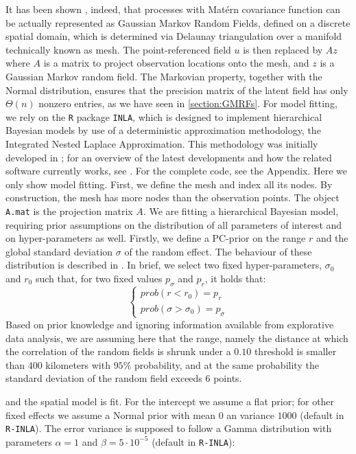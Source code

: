 \documentclass{book}
\begin{document}
It has been shown \cite{SPDE}, indeed, that processes with Matérn covariance function can be actually represented as Gaussian Markov Random Fields, defined on a discrete spatial domain, which is determined via Delaunay triangulation over a manifold technically known as mesh. The point-referenced field $u$ is then replaced by $A z$ where $A$ is a matrix to project observation locations onto the mesh, and $z$ is a Gaussian Markov random field. The Markovian property, together with the Normal distribution, ensures that the precision matrix of the latent field has only $\Theta (n) $ nonzero entries, as we have seen in \ref{section:GMRFs}. For model fitting, we rely on the \texttt{R} package \texttt{INLA}, which is designed to implement hierarchical Bayesian models by use of a deterministic approximation methodology, the Integrated Nested Laplace Approximation. This methodology was initially developed in \cite{INLA}; for an overview of the latest developments and how the related software currently works, see \cite{INLAVB}. For the complete code, see the Appendix. Here we only show model fitting. First, we define the mesh and index all its nodes. By construction, the mesh has more nodes than the observation points. The object \texttt{A.mat} is the projection matrix $A$. We are fitting a hierarchical Bayesian model, requiring prior assumptions on the distribution of all parameters of interest and on hyper-parameters as well. Firstly, we define a PC-prior on the range $r$ and the global standard deviation $\sigma$ of the random effect. The behaviour of these distribution is described in \cite{SPDEPC}. In brief, we select two fixed hyper-parameters, $\sigma_0$ and $r_0$ such that, for two fixed values $p_\sigma$ and $p_r$, it holds that:
$$
\left\{\begin{array}{ll}
prob \left( r < r_0 \right) = p_r \\
prob \left( \sigma > \sigma_0 \right) = p_\sigma
\end{array} \right.
$$
Based on prior knowledge and ignoring information available from explorative data analysis, we are assuming here that the range, namely the distance at which the correlation of the random fields is shrunk under a $0.10$ threshold is smaller than $400$ kilometers with $95\%$ probability, and at the same probability the standard deviation of the random field exceeds $6$ points.

and the spatial model is fit. For the intercept we assume a flat prior; for other fixed effects we assume a Normal prior with mean $0$ an variance $1000$ (default in \texttt{R-INLA}). The error variance is supposed to follow a Gamma distribution with parameters $\alpha = 1$ and $\beta = 5 \cdot 10^{-5}$ (default in \texttt{R-INLA}):
\end{document}
